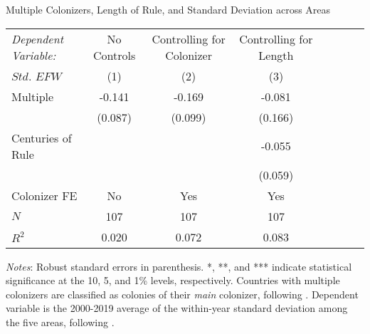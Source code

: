 \begin{threeparttable}[h!]
\begin{center}
\small
\caption{Multiple Colonizers, Length of Rule, and Standard Deviation across Areas}
\label{tab:TabB6}
\begin{tabular*}{\textwidth}{@{\extracolsep{\fill}}lccccccc@{\extracolsep{\fill}}}
\hline\hline
                        \textit{Dependent Variable:}
                        &\multicolumn{1}{c}{No Controls}
                        &\multicolumn{1}{c}{Controlling for Colonizer}
                        &\multicolumn{1}{c}{Controlling for Length}\\
            $Std.$ $EFW$&\multicolumn{1}{c}{(1)}&\multicolumn{1}{c}{(2)}&\multicolumn{1}{c}{(3)}\\
\hline
Multiple    &      -0.141         &      -0.169\sym{*}  &     -0.081         \\
            &    (0.087)         &    (0.099)         &     (0.166)         \\
[0.5em]
Centuries of Rule   &                     &                     &     -0.055         \\
            &                     &                     &    (0.059)         \\
[1em]
Colonizer FE & No & Yes & Yes \\
\hline
\(N\)       &         107         &         107         &         107         \\
\(R^{2}\)   &       0.020         &       0.072         &       0.083         \\
\hline\hline
\end{tabular*}
\begin{tablenotes}
\small
\item \textit{Notes}: Robust standard errors in parenthesis. *, **, and *** indicate statistical significance at the 10, 5, and 1\% levels, respectively. Countries with multiple colonizers are classified as colonies of their \textit{main} colonizer, following \cite{laporta1999quality}. Dependent variable is the 2000-2019 average of the within-year standard deviation among the five areas, following \cite{bolen2020does}.
\end{tablenotes}
\end{center}
\end{threeparttable}